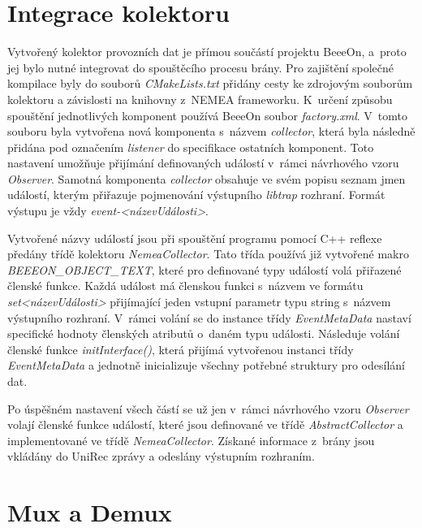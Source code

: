 
\section{Integrace kolektoru}    
     Vytvořený kolektor provozních dat je přímou součástí projektu BeeeOn, a~proto jej bylo nutné 
     integrovat do spouštěcího procesu brány. Pro zajištění společné kompilace byly do souborů 
     \textit{CMakeLists.txt} přidány cesty ke zdrojovým souborům kolektoru a závislosti na knihovny
     z~NEMEA frameworku. K~určení způsobu spouštění jednotlivých komponent používá BeeeOn
     soubor \textit{factory.xml}. V~tomto souboru byla vytvořena nová komponenta s~názvem 
     \textit{collector}, 
     která byla následně přidána pod označením \textit{listener} do specifikace ostatních komponent.
     Toto nastavení 
     umožňuje přijímání definovaných událostí v~rámci návrhového vzoru \textit{Observer}.
     Samotná komponenta \textit{collector}
     obsahuje ve svém popisu seznam jmen událostí, kterým přiřazuje pojmenování výstupního \textit{libtrap}
     rozhraní. Formát výstupu je vždy \textit{event-<názevUdálosti>}. 
     
     Vytvořené názvy událostí jsou při spouštění programu pomocí C++ reflexe předány třídě kolektoru
     \textit{NemeaCollector}. Tato třída používá již vytvořené makro \textit{BEEEON\_OBJECT\_TEXT},
     které pro definované 
     typy událostí volá přiřazené členské funkce. Každá událost má členskou funkci s~názvem ve formátu 
     \textit{set<názevUdálosti>} přijímající jeden vstupní parametr typu string s~názvem výstupního 
     rozhraní. V~rámci volání se do instance třídy \textit{EventMetaData}
     nastaví specifické hodnoty členských
     atributů o~daném typu události. Následuje volání členské funkce \textit{initInterface()},
     která přijímá vytvořenou instanci třídy  \textit{EventMetaData} a
     jednotně inicializuje všechny potřebné struktury pro odesílání dat.
     
     Po úspěšném nastavení všech částí se už jen v~rámci návrhového vzoru \textit{Observer} volají
     členské funkce událostí, které jsou definované ve třídě \textit{AbstractCollector} a implementované
     ve třídě \textit{NemeaCollector}. Získané informace z~brány jsou vkládány do UniRec zprávy a odeslány
     výstupním rozhraním.
     
\section{Mux a Demux}    

